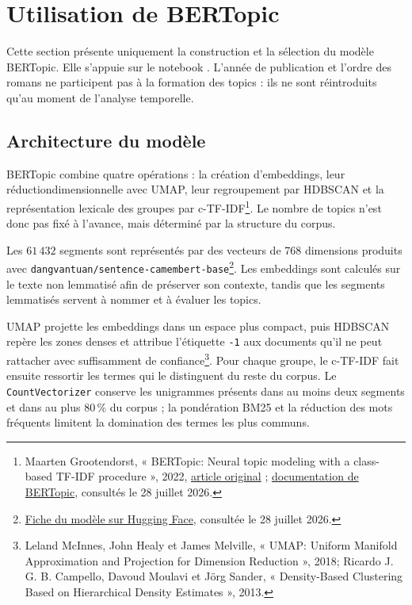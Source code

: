 \section{Utilisation de BERTopic}
\label{sec:utilisation_bertopic}

Cette section présente uniquement la construction et la sélection du modèle BERTopic. Elle s'appuie sur le notebook . L'année de publication et l'ordre des romans ne participent pas à la formation des topics : ils ne sont réintroduits qu'au moment de l'analyse temporelle.

\subsection{Architecture du modèle}

BERTopic combine quatre opérations : la création d'embeddings, leur réductiondimensionnelle avec UMAP, leur regroupement par HDBSCAN et la représentation lexicale des groupes par c-TF-IDF\footnote{Maarten Grootendorst, « BERTopic: Neural topic modeling with a class-based TF-IDF procedure », 2022, \href{https://arxiv.org/abs/2203.05794}{article original} ; \href{https://maartengr.github.io/BERTopic/algorithm/algorithm.html} {documentation de BERTopic}, consultés le 28 juillet 2026.}. Le nombre de topics n'est donc pas fixé à l'avance, mais déterminé par la structure du corpus.

Les \(61\,432\) segments sont représentés par des vecteurs de 768 dimensions produits avec \texttt{dangvantuan/\allowbreak sentence-\allowbreak camembert-\allowbreak base}\footnote{\href{https://huggingface.co/dangvantuan/sentence-camembert-base} {Fiche du modèle sur Hugging Face}, consultée le 28 juillet 2026.}. Les embeddings sont calculés sur le texte non lemmatisé afin de préserver son contexte, tandis que les segments lemmatisés servent à nommer et à évaluer les topics.

UMAP projette les embeddings dans un espace plus compact, puis HDBSCAN repère les zones denses et attribue l'étiquette \texttt{-1} aux documents qu'il ne peut rattacher avec suffisamment de confiance\footnote{Leland McInnes, John Healy et James Melville, « UMAP: Uniform Manifold Approximation and Projection for Dimension Reduction », 2018; Ricardo J. G. B. Campello, Davoud Moulavi et Jörg Sander, « Density-Based Clustering Based on Hierarchical Density Estimates », 2013.}. Pour chaque groupe, le c-TF-IDF fait ensuite ressortir les termes qui le distinguent du reste du corpus. Le \texttt{CountVectorizer} conserve les unigrammes présents dans au moins deux segments et dans au plus \(80\,\%\) du corpus ; la pondération BM25 et la réduction des mots fréquents limitent la domination des termes les plus communs.


